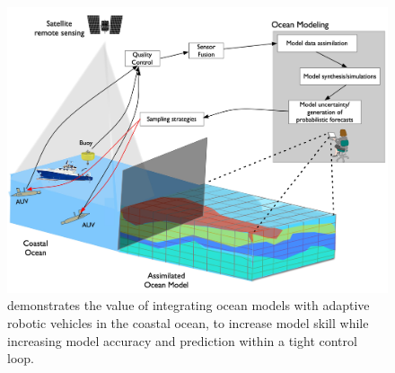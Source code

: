 

\begin{figure}[!]
  \centering
  \includegraphics[scale=0.5]{fig/ensemble-2.jpg}
  \caption{\proj demonstrates the value of integrating ocean models
    with adaptive robotic vehicles in the coastal ocean, to increase
    model skill while increasing model accuracy and prediction within
    a tight control loop.}
  \label{fig:block-diag}
\end{figure}



